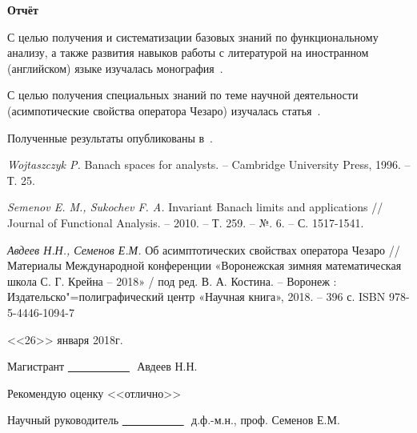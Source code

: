 \documentclass[a4paper,12pt,openbib]{report}
\begin{document}



\begin{center}{ \bf \Large Отчёт}%
\end{center}

С целью получения и систематизации базовых знаний по функциональному анализу,
а также развития навыков работы с литературой на иностранном (английском) языке изучалась монография~\cite{banachspaces}.

С целью получения специальных знаний по теме научной деятельности (асимпотические свойства оператора Чезаро)
изучалась статья~\cite{JFA}.

Полученные результаты опубликованы в~\cite{VZMS2018}.

\begin{thebibliography}{99}

		\textit{Wojtaszczyk P.}
		Banach spaces for analysts. – Cambridge University Press, 1996. – Т. 25.

		{\it Semenov E. M., Sukochev F. A.}
		Invariant Banach limits and applications // Journal of Functional Analysis. – 2010. – Т. 259. – №. 6. – С. 1517-1541.
	 
		\textit{Авдеев Н.Н., Семенов Е.М.}
		Об асимптотических свойствах оператора Чезаро
		// 
		Материалы Международной конференции «Воронежская зимняя математическая школа С. Г. Крейна – 2018»
		/ под ред. В. А. Костина. – Воронеж : Издательско"=полиграфический центр «Научная книга», 2018. – 396 с.
		ISBN 978-5-4446-1094-7
		
		
\end{thebibliography}

<<26>> января 2018г.

\vspace{2em}

Магистрант \hfill \underline{~~~~~~~~~~~}\,\,\,\,Авдеев Н.Н.\newline

\vspace{2em}

Рекомендую оценку <<отлично>>

\vspace{2em}

Научный руководитель \hfill \underline{~~~~~~~~~~~}\,\,\,\,д.ф.-м.н., проф. Семенов Е.М.\newline
\end{document}
